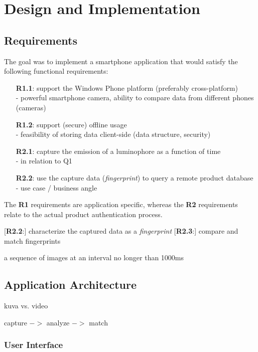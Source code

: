 \documentclass[thesis.tex]{subfiles}
\begin{document}
\chapter{Design and Implementation}
\label{chapter:design-implementation}


\section{Requirements}

The goal was to implement a smartphone application that would satisfy the following functional requirements:

\begin{itemize}[leftmargin=0.74in]
	\item [\textbf{R1.1}:] support the Windows Phone platform (preferably cross-platform)\\
	- powerful smartphone camera, ability to compare data from different phones (cameras)
	\item [\textbf{R1.2}:] support (secure) offline usage\\
	- feasibility of storing data client-side (data structure, security)
    \item [\textbf{R2.1}:] capture the emission of a luminophore as a function of time\\
    - in relation to Q1
    \item [\textbf{R2.2}:] use the capture data (\emph{fingerprint}) to query a remote product database\\
    - use case / business angle
\end{itemize}

\noindent The \textbf{R1} requirements are application specific, whereas the \textbf{R2} requirements relate to the actual product authentication process.

[\textbf{R2.2}:] characterize the captured data as a \emph{fingerprint}
[\textbf{R2.3}:] compare and match fingerprints

a sequence of images at an interval no longer than 1000ms

\section{Application Architecture}

kuva vs. video

capture $->$ analyze $->$ match

\subsection{User Interface}
\end{document}
